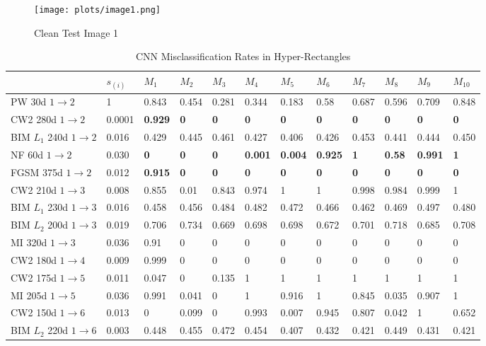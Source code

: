 \documentclass[12pt]{article}
\begin{document}
%
\begin{figure}[tb]
\centering
\texttt{[image: plots/image1.png]}
\caption{Clean Test Image 1}
\label{fig-1}
\end{figure}

%
\begin{table}[t]
\caption{CNN Misclassification Rates in Hyper-Rectangles}
\label{tab:hyper-rec-misrate}
\begin{center}
{\footnotesize  
\begin{tabular}{|l|l|llllllllll|} \hline
  &$s_{(i)}$ &$M_1$&$M_2$&$M_3$&$M_4$&$M_5$&$M_6$&$M_7$&$M_8$&$M_9$&$M_{10}$\\\hline
PW 30d $1\to 2$ & 1 & 0.843&0.454&0.281&0.344&0.183&0.58&0.687&0.596&0.709&	0.848 \\   
CW2 280d $1\to 2$& 0.0001 & {\bf 0.929} &  {\bf 0} & {\bf 0} & {\bf 0}
& {\bf 0} & {\bf 0} & {\bf 0} & {\bf 0} & {\bf 0} & {\bf 0} \\
BIM $L_1$ 240d $1\to 2$&0.016 & 0.429 & 0.445 & 0.461 & 0.427 & 0.406 & 0.426 & 0.453& 0.441 & 0.444 & 0.450 \\
NF 60d  $1\to 2$& 0.030 & {\bf 0} & {\bf 0} & {\bf 0} & {\bf 0.001} &
{\bf 0.004} & {\bf 0.925} & {\bf 1} & {\bf 0.58} & {\bf 0.991} & {\bf 1} \\
FGSM 375d $1\to 2$& 0.012 & {\bf 0.915} & {\bf 0} & {\bf 0} & {\bf 0}
& {\bf 0} & {\bf 0} & {\bf 0}& {\bf 0} & {\bf 0} & {\bf 0} \\\hline
CW2 210d $1\to 3$&0.008 & 0.855 & 0.01 & 0.843 & 0.974 & 1 & 1 & 0.998 & 0.984 & 0.999& 1  \\  
BIM $L_1$ 230d $1\to 3$&0.016 & 0.458 & 0.456 & 0.484 & 0.482 & 0.472 & 0.466 & 0.462 & 0.469 & 0.497 & 0.480 \\
BIM $L_2$ 200d $1\to 3$&0.019 & 0.706 & 0.734 & 0.669 & 0.698 & 0.698 & 0.672 & 0.701 & 0.718 & 0.685 & 0.708 \\
MI 320d $1\to 3$&0.036 & 0.91 & 0 & 0 & 0 & 0 & 0 & 0 & 0 & 0 & 0 \\\hline
CW2 180d $1\to 4$ &0.009 & 0.999 & 0 & 0 & 0 & 0 & 0 & 0 & 0 & 0 & 0\\\hline
CW2 175d $1\to 5$ &0.011 & 0.047 & 0     & 0.135 & 1 & 1 & 1 & 1 & 1 & 1 & 1 \\
MI 205d $1\to 5$&0.036 & 0.991 & 0.041 & 0 & 1 & 0.916 & 1 & 0.845 & 0.035 & 0.907 & 1 \\\hline
CW2 150d $1\to 6$&0.013 &  0 & 0.099 & 0 &  0.993 & 0.007 &
0.945 & 0.807 & 0.042 & 1 & 0.652 \\
BIM $L_2$ 220d $1\to 6$&0.003 & 0.448 & 0.455 & 0.472 & 0.454 & 0.407 & 0.432 & 0.421& 0.449 & 0.431 & 0.421 \\\hline

\end{tabular}}
\end{center}
\end{table}
\end{document}
